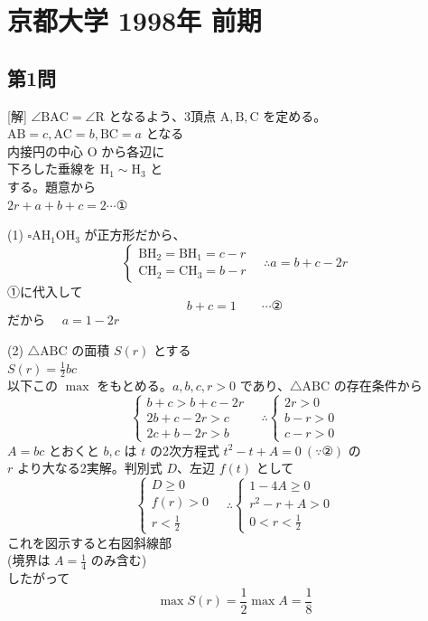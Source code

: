 \documentclass[../main.tex]{subfiles}
\begin{document}
\section*{京都大学 1998年 前期}

\subsection*{第1問}
\begin{minipage}[t]{0.5\textwidth}
  [解] $\angle \text{BAC} = \angle \text{R}$ となるよう、3頂点 $\text{A}, \text{B}, \text{C}$ を定める。\\
  $\text{AB}=c, \text{AC}=b, \text{BC}=a$ となる\\
  内接円の中心 $\text{O}$ から各辺に\\
  下ろした垂線を $\text{H}_1 \sim \text{H}_3$ と\\
  する。題意から\\
  $2r + a + b + c = 2 \cdots \text{①}$

  (1) $\square \text{AH}_1\text{OH}_3$ が正方形だから、
  \[
    \begin{cases}
      \text{BH}_2 = \text{BH}_1 = c-r \\
      \text{CH}_2 = \text{CH}_3 = b-r
    \end{cases}
    \quad \therefore a = b+c-2r
  \]
  ①に代入して
  \[
    b+c = 1 \qquad \cdots \text{②}
  \]
  だから $\quad a = 1-2r$

  (2) $\triangle \text{ABC}$ の面積 $S(r)$ とする\\
  $S(r) = \frac{1}{2}bc$\\
  以下この $\max$ をもとめる。$a, b, c, r > 0$ であり、$\triangle \text{ABC}$ の存在条件から
  \[
    \begin{cases}
      b+c > b+c-2r \\
      2b+c-2r > c \\
      2c+b-2r > b
    \end{cases}
    \quad \therefore
    \begin{cases}
      2r > 0 \\
      b-r > 0 \\
      c-r > 0
    \end{cases}
  \]
  $A = bc$ とおくと $b, c$ は $t$ の2次方程式 $t^2 - t + A = 0 \ (\because \text{②})$ の\\
  $r$ より大なる2実解。判別式 $D$、左辺 $f(t)$ として
  \[
    \begin{cases}
      D \ge 0 \\
      f(r) > 0 \\
      r < \frac{1}{2}
    \end{cases}
    \quad \therefore
    \begin{cases}
      1 - 4A \ge 0 \\
      r^2 - r + A > 0 \\
      0 < r < \frac{1}{2}
    \end{cases}
  \]
  これを図示すると右図斜線部\\
  (境界は $A = \frac{1}{4}$ のみ含む)\\
  したがって
  \[
    \max S(r) = \frac{1}{2} \max A = \frac{1}{8}
  \]
\end{minipage}
\end{document}
